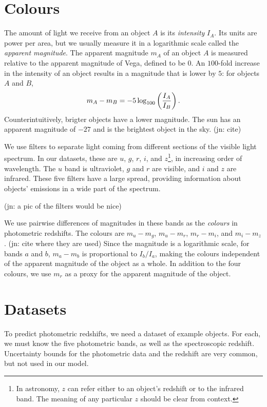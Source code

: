 \documentclass[11pt,twoside,openright]{report}
\newcommand\jn[1]{{\color{red}(jn: #1)}}
\begin{document}
  \section{Colours}

  The amount of light we receive from an object $A$ is its \emph{intensity} $I_A$. Its units are power per area, but we usually measure it in a logarithmic scale called the \emph{apparent magnitude}. The apparent magnitude $m_A$ of an object $A$ is measured relative to the apparent magnitude of Vega, defined to be $0$. An $100$-fold increase in the intensity of an object results in a magnitude that is lower by $5$: for objects $A$ and $B$,\[
    m_A - m_B = -5 \log_{100} \left( \frac{I_A}{I_B} \right) \text.
  \] Counterintuitively, brigter objects have a lower magnitude. The sun has an apparent magnitude of $-27$ and is the brightest object in the sky. \jn{cite}

  We use filters to separate light coming from different sections of the visible light spectrum. In our datasets, these are $u$, $g$, $r$, $i$, and $z$\footnote{In astronomy, $z$ can refer either to an object's redshift or to the infrared band. The meaning of any particular $z$ should be clear from context.}, in increasing order of wavelength. The $u$ band is ultraviolet, $g$ and $r$ are visible, and $i$ and $z$ are infrared. These five filters have a large spread, providing information about objects' emissions in a wide part of the spectrum.

  \jn{a pic of the filters would be nice}

  We use pairwise differences of magnitudes in these bands as the \emph{colours} in photometric redshifts. The colours are $m_u - m_g$, $m_u - m_r$, $m_r - m_i$, and $m_i - m_z$. \jn{cite where they are used} Since the magnitude is a logarithmic scale, for bands $a$ and $b$, $m_a - m_b$ is proportional to $I_b / I_a$, making the colours independent of the apparent magnitude of the object as a whole. In addition to the four colours, we use $m_r$ as a proxy for the apparent magnitude of the object.

  \section{Datasets}
  To predict photometric redshifts, we need a dataset of example objects. For each, we must know the five photometric bands, as well as the spectroscopic redshift. Uncertainty bounds for the photometric data and the redshift are very common, but not used in our model.
\end{document}
